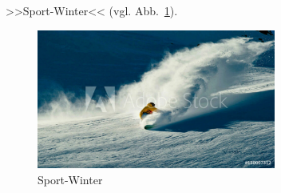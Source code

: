 >>Sport-Winter<< (vgl. Abb.~\ref{fig:Sport-Winter}).%
\begin{figure}[H]%
  \centering
  \includegraphics[width=0.7\textwidth]{images/Sport-Winter}
  \caption{Sport-Winter}%
  \label{fig:Sport-Winter}%
\end{figure}
  


